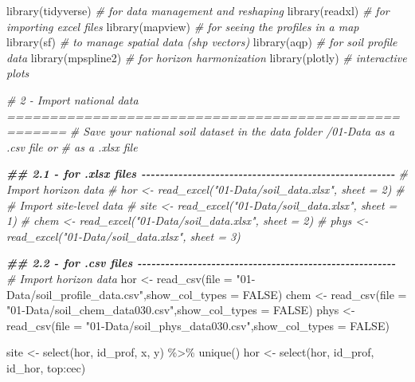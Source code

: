 \documentclass[
  10pt,
  b5paper,
  oneside]{book}
\newenvironment{Shaded}{\begin{snugshade}}{\end{snugshade}}
\newcommand{\AttributeTok}[1]{\textcolor[rgb]{0.77,0.63,0.00}{#1}}
\newcommand{\CommentTok}[1]{\textcolor[rgb]{0.56,0.35,0.01}{\textit{#1}}}
\newcommand{\ConstantTok}[1]{\textcolor[rgb]{0.00,0.00,0.00}{#1}}
\newcommand{\DocumentationTok}[1]{\textcolor[rgb]{0.56,0.35,0.01}{\textbf{\textit{#1}}}}
\newcommand{\FunctionTok}[1]{\textcolor[rgb]{0.00,0.00,0.00}{#1}}
\newcommand{\NormalTok}[1]{#1}
\newcommand{\OtherTok}[1]{\textcolor[rgb]{0.56,0.35,0.01}{#1}}
\newcommand{\SpecialCharTok}[1]{\textcolor[rgb]{0.00,0.00,0.00}{#1}}
\newcommand{\StringTok}[1]{\textcolor[rgb]{0.31,0.60,0.02}{#1}}
\begin{document}
\begin{Shaded}
\begin{Highlighting}[]
\FunctionTok{library}\NormalTok{(tidyverse) }\CommentTok{\# for data management and reshaping}
\FunctionTok{library}\NormalTok{(readxl) }\CommentTok{\# for importing excel files}
\FunctionTok{library}\NormalTok{(mapview) }\CommentTok{\# for seeing the profiles in a map}
\FunctionTok{library}\NormalTok{(sf) }\CommentTok{\# to manage spatial data (shp vectors) }
\FunctionTok{library}\NormalTok{(aqp) }\CommentTok{\# for soil profile data}
\FunctionTok{library}\NormalTok{(mpspline2) }\CommentTok{\# for horizon harmonization}
\FunctionTok{library}\NormalTok{(plotly) }\CommentTok{\# interactive plots}

\CommentTok{\# 2 {-} Import national data =====================================================}
\CommentTok{\# Save your national soil dataset in the data folder /01{-}Data as a .csv file or }
\CommentTok{\# as a .xlsx file}

\DocumentationTok{\#\# 2.1 {-} for .xlsx files {-}{-}{-}{-}{-}{-}{-}{-}{-}{-}{-}{-}{-}{-}{-}{-}{-}{-}{-}{-}{-}{-}{-}{-}{-}{-}{-}{-}{-}{-}{-}{-}{-}{-}{-}{-}{-}{-}{-}{-}{-}{-}{-}{-}{-}{-}{-}{-}{-}{-}{-}{-}{-}{-}{-}}
\CommentTok{\# Import horizon data }
\CommentTok{\# hor \textless{}{-} read\_excel("01{-}Data/soil\_data.xlsx", sheet = 2)}
\CommentTok{\# \# Import site{-}level data}
\CommentTok{\# site \textless{}{-} read\_excel("01{-}Data/soil\_data.xlsx", sheet = 1)}
\CommentTok{\# chem \textless{}{-} read\_excel("01{-}Data/soil\_data.xlsx", sheet = 2)}
\CommentTok{\# phys \textless{}{-} read\_excel("01{-}Data/soil\_data.xlsx", sheet = 3)}


\DocumentationTok{\#\# 2.2 {-} for .csv files {-}{-}{-}{-}{-}{-}{-}{-}{-}{-}{-}{-}{-}{-}{-}{-}{-}{-}{-}{-}{-}{-}{-}{-}{-}{-}{-}{-}{-}{-}{-}{-}{-}{-}{-}{-}{-}{-}{-}{-}{-}{-}{-}{-}{-}{-}{-}{-}{-}{-}{-}{-}{-}{-}{-}{-}}
\CommentTok{\# Import horizon data }
\NormalTok{hor }\OtherTok{\textless{}{-}} \FunctionTok{read\_csv}\NormalTok{(}\AttributeTok{file =} \StringTok{"01{-}Data/soil\_profile\_data.csv"}\NormalTok{,}\AttributeTok{show\_col\_types =} \ConstantTok{FALSE}\NormalTok{)}
\NormalTok{chem }\OtherTok{\textless{}{-}} \FunctionTok{read\_csv}\NormalTok{(}\AttributeTok{file =} \StringTok{"01{-}Data/soil\_chem\_data030.csv"}\NormalTok{,}\AttributeTok{show\_col\_types =} \ConstantTok{FALSE}\NormalTok{)}
\NormalTok{phys }\OtherTok{\textless{}{-}} \FunctionTok{read\_csv}\NormalTok{(}\AttributeTok{file =} \StringTok{"01{-}Data/soil\_phys\_data030.csv"}\NormalTok{,}\AttributeTok{show\_col\_types =} \ConstantTok{FALSE}\NormalTok{)}


\NormalTok{site }\OtherTok{\textless{}{-}} \FunctionTok{select}\NormalTok{(hor, id\_prof, x, y) }\SpecialCharTok{\%\textgreater{}\%} \FunctionTok{unique}\NormalTok{()}
\NormalTok{hor }\OtherTok{\textless{}{-}} \FunctionTok{select}\NormalTok{(hor, id\_prof, id\_hor, top}\SpecialCharTok{:}\NormalTok{cec)}


\end{Highlighting}
\end{Shaded}
\end{document}
